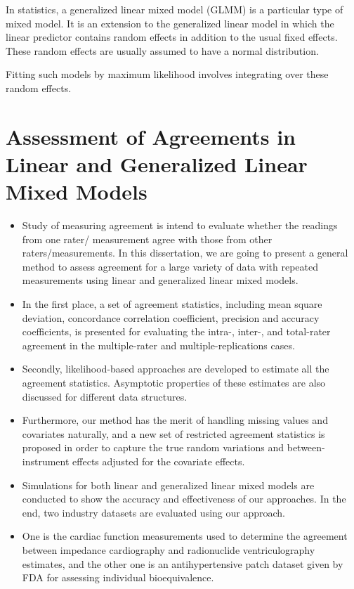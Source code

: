 \documentclass[Main.tex]{subfiles}
\begin{document}
	In statistics, a generalized linear mixed model (GLMM) is a particular type of mixed model. It is an extension to the
	generalized linear model in which the linear predictor contains random effects in addition to the usual fixed effects. These random effects are usually assumed to have a normal distribution.
	
	Fitting such models by maximum likelihood involves integrating over these random effects.
	
	
	
	
	
	
	\section{Assessment of Agreements in Linear and Generalized Linear Mixed Models}
	
	\begin{itemize}
		\item Study of measuring agreement is intend to evaluate whether the readings from one rater/ measurement 
		agree with those from other raters/measurements. 
		In this dissertation, we are going to present a general method to assess agreement for a large 
		variety of data with repeated measurements using linear and generalized linear mixed models. 
		\item In the first place, a set of agreement statistics, including mean square deviation, concordance 
		correlation coefficient, precision and accuracy coefficients, is presented for evaluating the 
		intra-, inter-, and total-rater agreement in the multiple-rater and multiple-replications cases. 
		\item Secondly, likelihood-based approaches are developed to estimate all the agreement statistics. 
		Asymptotic properties of these estimates are also discussed for different data structures. 
		\item Furthermore, our method has the merit of handling missing values and covariates naturally, 
		and a new set of restricted agreement statistics is proposed in order to capture the true random 
		variations and between-instrument effects adjusted for the covariate effects. 
		
		\item Simulations for both linear and generalized linear mixed models are conducted to show the accuracy and effectiveness 
		of our approaches. In the end, two industry datasets are evaluated using our approach. 
		\item One is the cardiac function measurements used to determine the agreement between impedance cardiography and radionuclide 
		ventriculography estimates, and the other one is an antihypertensive patch dataset given by FDA for assessing 
		individual bioequivalence.
\end{itemize}
\end{document}
